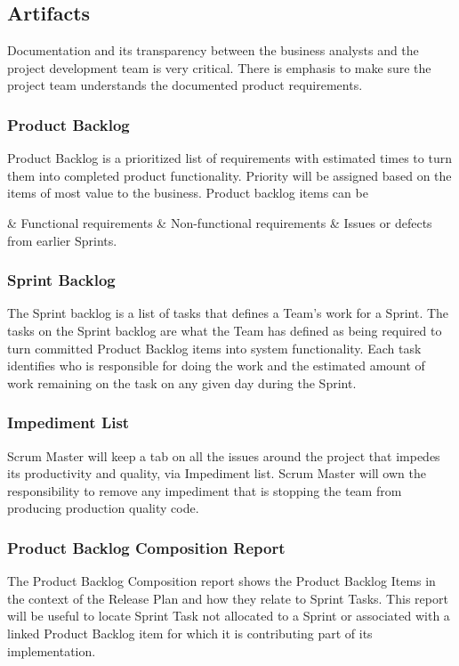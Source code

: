 \documentclass[a4paper]{article}
\begin{document}
	\subsection{Artifacts}
	Documentation and its transparency between the business analysts and the project development team is very critical. There is emphasis to make sure the project team understands the documented product requirements.
	
	\subsubsection{Product Backlog}
	Product Backlog is a prioritized list of requirements with estimated times to turn them into completed product functionality. Priority will be assigned based on the items of most value to the business. Product backlog items can be
	
	\begin{easylist}
		& \thinspace Functional requirements
		& \thinspace Non-functional requirements
		& \thinspace Issues or defects from earlier Sprints.
	\end{easylist}	

	\subsubsection{Sprint Backlog}
	The Sprint backlog is a list of tasks that defines a Team's work for a Sprint. The tasks on the Sprint backlog are what the Team has defined as being required to turn committed Product Backlog items into system functionality. Each task identifies who is responsible for doing the work and the estimated amount of work remaining on the task on any given day during the Sprint.

	\subsubsection{Impediment List}
	Scrum Master will keep a tab on all the issues around the project that impedes its productivity and quality, via Impediment list. Scrum Master will own the responsibility to remove any impediment that is stopping the team from producing production quality code.
	
	\subsubsection{Product Backlog Composition Report}
	The Product Backlog Composition report shows the Product Backlog Items in the context of the Release Plan and how they relate to Sprint Tasks. This report will be useful to locate Sprint Task not allocated to a Sprint or associated with a linked Product Backlog item for which it is contributing part of its implementation.
	
\end{document}
